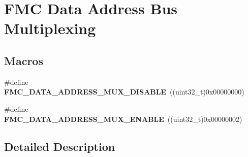 \hypertarget{group___f_m_c___data___address___bus___multiplexing}{}\section{F\+MC Data Address Bus Multiplexing}
\label{group___f_m_c___data___address___bus___multiplexing}
\subsection*{Macros}
\begin{DoxyCompactItemize}
\item 
\#define {\bfseries F\+M\+C\+\_\+\+D\+A\+T\+A\+\_\+\+A\+D\+D\+R\+E\+S\+S\+\_\+\+M\+U\+X\+\_\+\+D\+I\+S\+A\+B\+LE}~((uint32\+\_\+t)0x00000000)\hypertarget{group___f_m_c___data___address___bus___multiplexing_ga1419fde4656962a8a279ad72a0e6f57c}{}\label{group___f_m_c___data___address___bus___multiplexing_ga1419fde4656962a8a279ad72a0e6f57c}

\item 
\#define {\bfseries F\+M\+C\+\_\+\+D\+A\+T\+A\+\_\+\+A\+D\+D\+R\+E\+S\+S\+\_\+\+M\+U\+X\+\_\+\+E\+N\+A\+B\+LE}~((uint32\+\_\+t)0x00000002)\hypertarget{group___f_m_c___data___address___bus___multiplexing_ga725254689d3e6d669c5cf71466d30958}{}\label{group___f_m_c___data___address___bus___multiplexing_ga725254689d3e6d669c5cf71466d30958}

\end{DoxyCompactItemize}


\subsection{Detailed Description}
